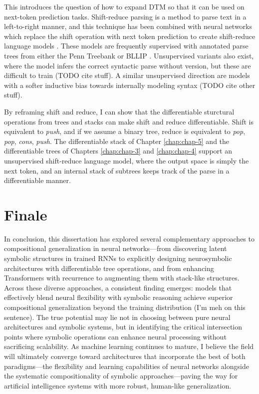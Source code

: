 This introduces the question of how to expand DTM so that it can be used on next-token prediction tasks. Shift-reduce parsing is a method to parse text in a left-to-right manner, and this technique has been combined with neural networks which replace the shift operation with next token prediction to create shift-reduce language models \citep{dyer_recurrent_2016, choe_parsing_2016, qian_structural_2021}. These models are frequently supervised with annotated parse trees from either the Penn Treebank \citep{marcus-etal-1993-building} or BLLIP \citep{charniak2000bllip}. Unsupervised variants also exist, where the model infers the correct syntactic parse without version, but these are difficult to train (TODO cite stuff). A similar unsupervised direction are models with a softer inductive bias towards internally modeling syntax (TODO cite other stuff).

By reframing shift and reduce, I can show that the differentiable sturctural operations from trees and stacks can make shift and reduce differentiable. Shift is equivalent to \textit{push}, and if we assume a binary tree, reduce is equivalent to \textit{pop}, \textit{pop}, \textit{cons}, \textit{push}. The differentiable stack of Chapter \ref{chap:chap-5} and the differentiable trees of Chapters \ref{chap:chap-3} and \ref{chap:chap-4} support an unsupervised shift-reduce language model, where the output space is simply the next token, and an internal stack of subtrees keeps track of the parse in a differentiable manner.

\section{Finale}
In conclusion, this dissertation has explored several complementary approaches to compositional generalization in neural networks—from discovering latent symbolic structures in trained RNNs to explicitly designing neurosymbolic architectures with differentiable tree operations, and from enhancing Transformers with recurrence to augmenting them with stack-like structures. Across these diverse approaches, a consistent finding emerges: models that effectively blend neural flexibility with symbolic reasoning achieve superior compositional generalization beyond the training distribution (I'm meh on this sentence). The true potential may lie not in choosing between pure neural architectures and symbolic systems, but in identifying the critical intersection points where symbolic operations can enhance neural processing without sacrificing scalability. As machine learning continues to mature, I believe the field will ultimately converge toward architectures that incorporate the best of both paradigms—the flexibility and learning capabilities of neural networks alongside the systematic compositionality of symbolic approaches—paving the way for artificial intelligence systems with more robust, human-like generalization.